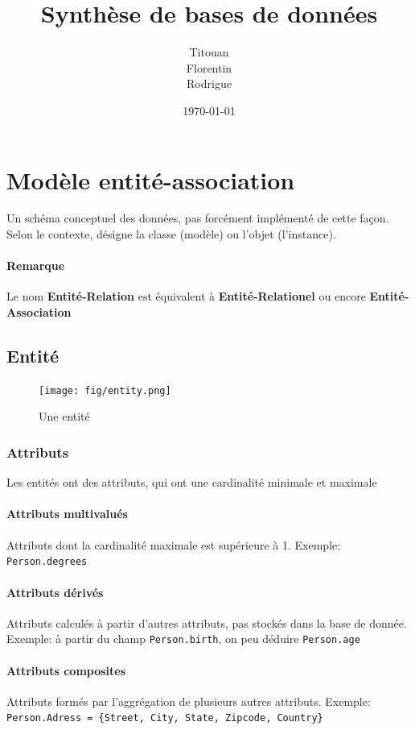 \documentclass[a4paper]{article}
\author{Titouan \bsc{Christophe}\\Florentin \bsc{Hennecker}\\Rodrigue \bsc{Van Brande}}
\title{Synthèse de bases de données}
\date{\today}
\begin{document}
\maketitle
\tableofcontents

\section{Modèle entité-association}
Un schéma conceptuel des données, pas forcément implémenté de cette façon.
Selon le contexte, désigne la classe (modèle) ou l'objet (l'instance).

\paragraph{Remarque} Le nom \textbf{Entité-Relation} est équivalent à
\textbf{Entité-Relationel} ou encore \textbf{Entité-Association}

\subsection{Entité}
\begin{figure}[H]
    \center
    \texttt{[image: fig/entity.png]}
    \caption{Une entité}
\end{figure}

\subsubsection{Attributs}
Les entités ont des attributs, qui ont une cardinalité minimale et maximale

\paragraph{Attributs multivalués}
Attributs dont la cardinalité maximale est supérieure à 1.
Exemple: \texttt{Person.degrees}

\paragraph{Attributs dérivés}
Attributs calculés à partir d'autres attributs, pas stockés dans la base de donnée.
Exemple: à partir du champ \texttt{Person.birth}, on peu déduire \texttt{Person.age}

\paragraph{Attributs composites}
Attributs formés par l'aggrégation de plusieurs autres attributs.
Exemple: \texttt{Person.Adress = \{Street, City, State, Zipcode, Country\}}
\end{document}
